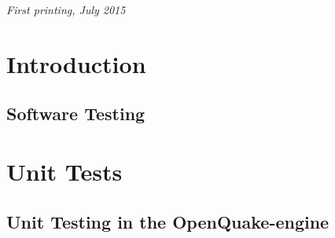 \documentclass[11pt,fleqn]{book} %
\begin{document}
\noindent \textit{First printing, July 2015} %


\pagestyle{empty} %
\tableofcontents %
\cleardoublepage %
\pagestyle{fancy} %

% 


\part{Introduction}

\chapter{Software Testing}
   \label{chap:intro}
   

\thispagestyle{empty}
\part{Unit Tests}

\chapter{Unit Testing in the OpenQuake-engine}
   \label{chap:unit-tests}
   
   \cleardoublepage
\end{document}
